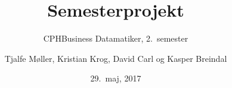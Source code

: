 \documentclass[12pt,twoside]{report}
\begin{document}
\title{Semesterprojekt}
\date{29.\ maj, 2017}
\author{CPHBusiness \- Datamatiker, 2.\ semester}
\author{Tjalfe M\o ller, Kristian Krog, David Carl og Kasper Breindal}

\maketitle
\tableofcontents


\end{document}
